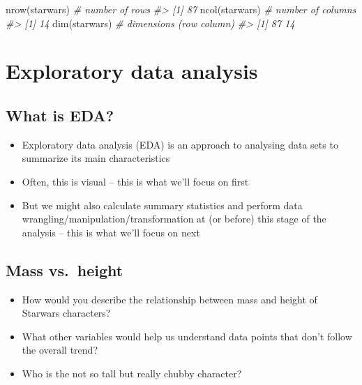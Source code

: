 \documentclass[
]{book}
\newenvironment{Shaded}{\begin{snugshade}}{\end{snugshade}}
\newcommand{\CommentTok}[1]{\textcolor[rgb]{0.56,0.35,0.01}{\textit{#1}}}
\newcommand{\FunctionTok}[1]{\textcolor[rgb]{0.00,0.00,0.00}{#1}}
\newcommand{\NormalTok}[1]{#1}
\providecommand{\tightlist}{%
  \setlength{\itemsep}{0pt}\setlength{\parskip}{0pt}}
\theoremstyle{definition}
\theoremstyle{definition}
\theoremstyle{definition}
\theoremstyle{definition}
\theoremstyle{remark}
\begin{document}
\begin{Shaded}
\begin{Highlighting}[]
\FunctionTok{nrow}\NormalTok{(starwars) }\CommentTok{\# number of rows}
\CommentTok{\#\textgreater{} [1] 87}
\FunctionTok{ncol}\NormalTok{(starwars) }\CommentTok{\# number of columns}
\CommentTok{\#\textgreater{} [1] 14}
\FunctionTok{dim}\NormalTok{(starwars)  }\CommentTok{\# dimensions (row column)}
\CommentTok{\#\textgreater{} [1] 87 14}
\end{Highlighting}
\end{Shaded}

\hypertarget{exploratory-data-analysis}{%
\chapter{Exploratory data analysis}\label{exploratory-data-analysis}}

\hypertarget{what-is-eda}{%
\section{What is EDA?}\label{what-is-eda}}

\begin{itemize}
\tightlist
\item
  Exploratory data analysis (EDA) is an approach to analysing data sets to summarize its main characteristics
\item
  Often, this is visual -- this is what we'll focus on first
\item
  But we might also calculate summary statistics and perform data wrangling/manipulation/transformation at (or before) this stage of the analysis -- this is what we'll focus on next
\end{itemize}

\hypertarget{mass-vs.-height}{%
\section{Mass vs.~height}\label{mass-vs.-height}}

\begin{itemize}
\tightlist
\item
  How would you describe the relationship between mass and height of Starwars characters?
\item
  What other variables would help us understand data points that don't follow the overall trend?
\item
  Who is the not so tall but really chubby character?
\end{itemize}
\end{document}
